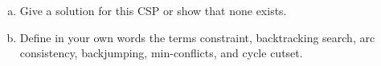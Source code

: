 \documentclass[a4paper]{article}
\begin{document}
\begin{enumerate}[(a)]
\item Give a solution for this CSP or show that none exists. 

\vspace{5em}

\item Define in your own words the terms constraint, backtracking search, arc consistency, backjumping, min-conflicts, and cycle cutset.

\newpage


\end{enumerate}
\end{document}
